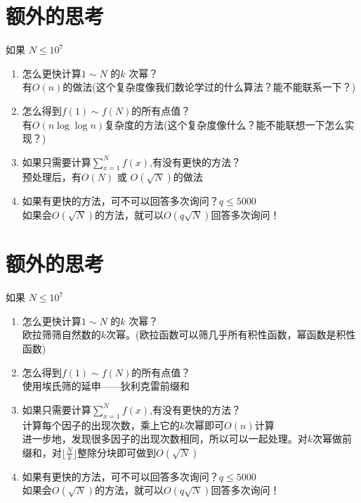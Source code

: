 \documentclass[11pt]{beamer}
\begin{document}
\section{额外的思考}
\begin{frame}
如果 $N \leq 10^7$
\begin{enumerate}
    \item 怎么更快计算$1 \sim N$ 的$k$ 次幂？\\
        有$O(n)$的做法(这个复杂度像我们数论学过的什么算法？能不能联系一下？)
    \item 怎么得到$f(1)\sim f(N)$的所有点值？\\
        有$O(n \log \log n)$复杂度的方法(这个复杂度像什么？能不能联想一下怎么实现？)
    \item 如果只需要计算$\sum_{x = 1}^N f(x)$,有没有更快的方法？\\
        预处理后，有$O(N)$ 或 $O(\sqrt N)$的做法
    \item 如果有更快的方法，可不可以回答多次询问？$q \leq 5000$\\
        如果会$O(\sqrt N)$的方法，就可以$O(q\sqrt N)$回答多次询问！
\end{enumerate}
\end{frame}

\section{额外的思考}
\begin{frame}
如果 $N \leq 10^7$
\begin{enumerate}
    \item 怎么更快计算$1 \sim N$ 的$k$ 次幂？\\
        欧拉筛筛自然数的$k$次幂。(欧拉函数可以筛几乎所有积性函数，幂函数是积性函数)
    \item 怎么得到$f(1)\sim f(N)$的所有点值？\\
        使用埃氏筛的延申——狄利克雷前缀和
    \item 如果只需要计算$\sum_{x = 1}^N f(x)$,有没有更快的方法？\\
        计算每个因子的出现次数，乘上它的$k$次幂即可$O(n)$计算\\
        进一步地，发现很多因子的出现次数相同，所以可以一起处理。对$k$次幂做前缀和，对$\lfloor\frac{N}{k}\rfloor$整除分块即可做到$O(\sqrt N)$
    \item 如果有更快的方法，可不可以回答多次询问？$q \leq 5000$\\
        如果会$O(\sqrt N)$的方法，就可以$O(q\sqrt N)$回答多次询问！
\end{enumerate}
\end{frame}
\end{document}
